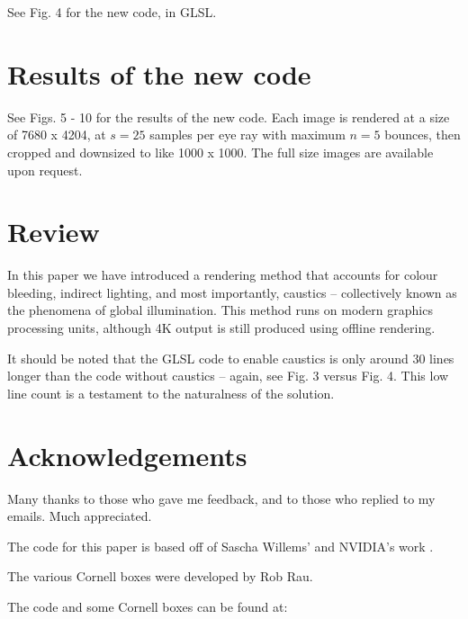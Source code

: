 \documentclass[12pt]{article}
\begin{document}
See Fig. 4 for the new code, in GLSL.




\section{Results of the new code}

See Figs. 5 - 10 for the results of the new code.
Each image is rendered at a size of 7680 x 4204, at $s = 25$ samples per eye ray with maximum $n = 5$ bounces, then cropped and downsized to like 1000 x 1000.
The full size images are available upon request.









\section{Review}

In this paper we have introduced a rendering method that accounts for colour bleeding, indirect lighting, and most importantly, caustics -- collectively known as the phenomena of global illumination.
This method runs on modern graphics processing units, although 4K output is still produced using offline rendering.

It should be noted that the GLSL code to enable caustics is only around $30$ lines longer than the code without caustics -- again, see Fig. 3 versus Fig. 4.
This low line count is a testament to the naturalness of the solution.





\section{Acknowledgements}

Many thanks to those who gave me feedback, and to those who replied to my emails.
Much appreciated.

The code for this paper is based off of Sascha Willems' and NVIDIA's work \cite{willems1, willems2, nvidia}.

The various Cornell boxes were developed by Rob Rau.

The code and some Cornell boxes can be found at:
\end{document}
